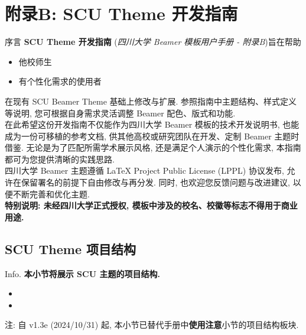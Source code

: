 \section{附录B: SCU Theme 开发指南}
\begin{frame}{序言}
	\textbf{SCU Theme 开发指南} (\textit{四川大学 Beamer 模板用户手册 - 附录B})旨在帮助
  \begin{itemize}
    \item \alert{他校师生}
    \item \alert{有个性化需求的使用者}
  \end{itemize}
  在现有 SCU Beamer Theme 基础上修改与扩展. 参照指南中主题结构、样式定义等说明, 您可根据自身需求灵活调整 Beamer 配色、版式和功能.\\

  在此希望这份开发指南不仅能作为四川大学 Beamer 模板的技术开发说明书, 也能成为一份可移植的参考文档, 供其他高校或研究团队在开发、定制 Beamer 主题时借鉴. 无论是为了匹配所需学术展示风格, 还是满足个人演示的个性化需求, 本指南都可为您提供清晰的实践思路.\\

  四川大学 Beamer 主题遵循 \alert{LaTeX Project Public License (LPPL)} 协议发布, 允许在保留署名的前提下自由修改与再分发. 同时, 也欢迎您反馈问题与改进建议, 以便不断完善和优化主题.\\

  \textbf{\alert{特别说明: 未经四川大学正式授权, 模板中涉及的校名、校徽等标志不得用于商业用途.}}
\end{frame}

\subsection{SCU Theme 项目结构}
\begin{frame}{Info.}
	\textbf{本小节将展示 SCU 主题的项目结构.}
	\begin{multicols}{2}
		\begin{itemize}
			\item {}
			\item {}
		\end{itemize}
	\end{multicols}
	注: 自 \textcolor{scugreen}{v1.3e (2024/10/31)} 起, 本小节已替代手册中\alert{\textbf{使用注意}}小节的\alert{项目结构}板块.\par
	\mycopyright
\end{frame}

